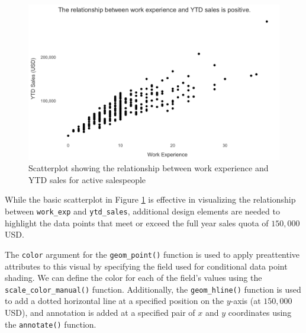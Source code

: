 \documentclass[
]{book}
\begin{document}
\begin{figure}

{\centering \includegraphics[width=1\linewidth]{graphics/scatterplot_1} 

}

\caption{Scatterplot showing the relationship between work experience and YTD sales for active salespeople}\label{fig:scatterplot-1}
\end{figure}

While the basic scatterplot in Figure \ref{fig:scatterplot-1} is effective in visualizing the relationship between \texttt{work\_exp} and \texttt{ytd\_sales}, additional design elements are needed to highlight the data points that meet or exceed the full year sales quota of \(150,000\) USD.

The \texttt{color} argument for the \texttt{geom\_point()} function is used to apply preattentive attributes to this visual by specifying the field used for conditional data point shading. We can define the color for each of the field's values using the \texttt{scale\_color\_manual()} function. Additionally, the \texttt{geom\_hline()} function is used to add a dotted horizontal line at a specified position on the \(y\)-axis (at \(150,000\) USD), and annotation is added at a specified pair of \(x\) and \(y\) coordinates using the \texttt{annotate()} function.
\end{document}
